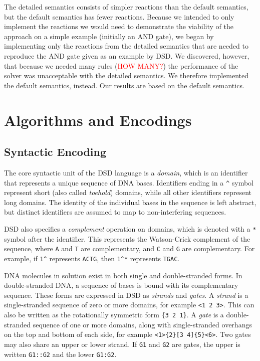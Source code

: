 \documentclass{article}
\begin{document}
The detailed semantics consists of simpler reactions than the default
semantics, but the default semantics has fewer reactions. Because we
intended to only implement the reactions we would need to demonstrate
the viability of the approach on a simple example (initially an
AND gate), we began by implementing only the reactions from the
detailed semantics that are needed to reproduce the AND gate given as
an example by DSD. We discovered, however, that because we needed many
rules (\textcolor{red}{HOW MANY?}) the performance of the solver was
unacceptable with the detailed semantics. We therefore implemented the
default semantics, instead. Our results are based on the default semantics.

\section{Algorithms and Encodings}

\subsection{Syntactic Encoding}

The core syntactic unit of the DSD language is a \emph{domain}, which is an
identifier that represents a unique sequence of DNA bases.  Identifiers ending
in a \lstinline{^} symbol represent short (also called \emph{toehold}) domains,
while all other identifiers represent long domains. The identity of the
individual bases in the sequence is left abstract, but distinct identifiers are
assumed to map to non-interfering sequences. 

DSD also specifies a \emph{complement} operation on domains, which is denoted
with a \lstinline{*} symbol after the identifier. This represents the
Watson-Crick complement of the sequence, where \lstinline{A} and \lstinline{T}
are complementary, and \lstinline{C} and \lstinline{G} are complementary.  
For example, if \lstinline{1^} represents \lstinline{ACTG}, then \lstinline{1^*}
represents \lstinline{TGAC}.

DNA molecules in solution exist in both single and double-stranded forms.
In double-stranded DNA, a sequence of bases is bound with its complementary
sequence. These forms are expressed in DSD as \emph{strands} and \emph{gates}.
A \emph{strand} is a single-stranded sequence of zero or more domains, for
example \verb;<1 2 3>;. This can also be written as the rotationally symmetric
form \verb;{3 2 1};.
A \emph{gate} is a double-stranded sequence of one or more domains,
along with single-stranded overhangs on the top and bottom of each side,
for example \verb;<1>{2}[3 4]{5}<6>;.
Two gates may also share an upper or lower strand. If \verb;G1; and \verb;G2;
are gates, the upper is written \verb;G1::G2; and the lower \verb;G1:G2;.
\end{document}
